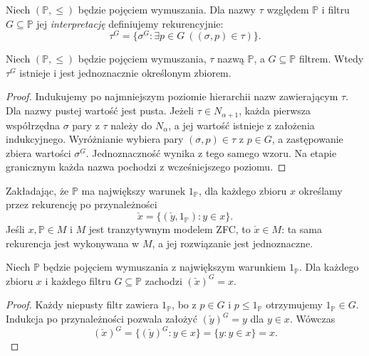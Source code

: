 \begin{definicja}\label{def:forcing-valuation}
Niech $(\mathbb P,\leq)$ będzie pojęciem wymuszania.
Dla nazwy $\tau$ względem $\mathbb P$
i filtru $G\subseteq\mathbb P$
jej \emph{interpretację} definiujemy rekurencyjnie:
\[
 \tau^G=
 \{\sigma^G:\exists p\in G\
                      ((\sigma,p)\in\tau)\}.
\]
\end{definicja}

\begin{lemat}
\label{lem:forcing-valuation-exists}
Niech $(\mathbb P,\leq)$ będzie pojęciem
wymuszania, $\tau$ nazwą $\mathbb P$,
a $G\subseteq\mathbb P$ filtrem.
Wtedy $\tau^G$ istnieje i jest
jednoznacznie określonym zbiorem.
\end{lemat}
\begin{proof}
Indukujemy po najmniejszym poziomie
hierarchii nazw zawierającym $\tau$.
Dla nazwy pustej wartość jest pusta.
Jeżeli $\tau\in N_{\alpha+1}$,
każda pierwsza współrzędna $\sigma$
pary z $\tau$ należy do $N_\alpha$,
a jej wartość istnieje z założenia
indukcyjnego. Wyróżnianie wybiera
pary $(\sigma,p)\in\tau$ z $p\in G$,
a zastępowanie zbiera wartości $\sigma^G$.
Jednoznaczność wynika z tego samego
wzoru. Na etapie granicznym każda nazwa
pochodzi z wcześniejszego poziomu.
\end{proof}

\begin{definicja}
\label{def:forcing-check}
Zakładając, że $\mathbb P$ ma największy
warunek $1_{\mathbb P}$, dla każdego zbioru $x$
określamy przez rekurencję po przynależności
\[
 \check x=\{(\check y,1_{\mathbb P}):y\in x\}.
\]
Jeśli $x,\mathbb P\in M$ i $M$ jest
tranzytywnym modelem ZFC, to $\check x\in M$:
ta sama rekurencja jest wykonywana w $M$,
a jej rozwiązanie jest jednoznaczne.
\end{definicja}

\begin{lemat}
\label{lem:forcing-check-evaluation}
Niech $\mathbb P$ będzie pojęciem wymuszania
z największym warunkiem $1_{\mathbb P}$.
Dla każdego zbioru $x$ i każdego
filtru $G\subseteq\mathbb P$ zachodzi
$(\check x)^G=x$.
\end{lemat}
\begin{proof}
Każdy niepusty filtr zawiera
$1_{\mathbb P}$, bo z $p\in G$
i $p\leq1_{\mathbb P}$ otrzymujemy
$1_{\mathbb P}\in G$.
Indukcja po przynależności pozwala
założyć $(\check y)^G=y$ dla $y\in x$.
Wówczas
\[
 (\check x)^G
 =\{(\check y)^G:y\in x\}
 =\{y:y\in x\}=x.
\]
\end{proof}

